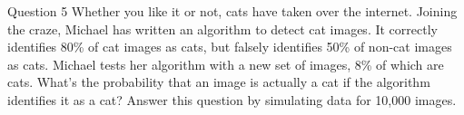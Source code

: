\documentclass[12pt]{beamer}
\begin{document}
{%
\begin{frame}{}
\begin{block}{Question 5}
Whether you like it or not, cats have taken over the internet.
Joining the craze, Michael has written an algorithm to detect cat images.
It correctly identifies 80\% of cat images as cats, but falsely identifies 50\% of non-cat images as cats.
Michael tests her algorithm with a new set of images, 8\% of which are cats. What’s the probability that an image is actually a cat if the algorithm identifies it as a cat?
Answer this question by simulating data for 10,000 images.
\end{block}
\end{frame}
}
\end{document}
